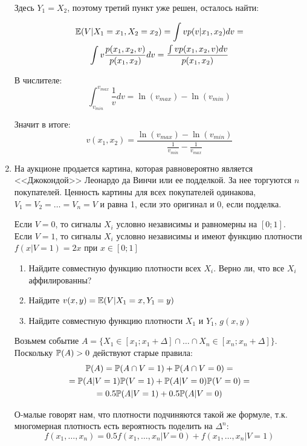 \begin{enumerate}
Здесь $ Y_{1}=X_{2} $, поэтому третий пункт уже решен, осталось найти:

\begin{multline}
\E(V|X_{1}=x_{1}, X_{2}=x_{2})=\int v p(v|x_{1},x_{2})dv=\\
\int v \frac{p(x_{1},x_{2},v)}{p(x_{1},x_{2})} dv=\frac{\int v p(x_{1},x_{2},v) dv }{p(x_{1},x_{2})}
\end{multline}

В числителе:
\begin{equation}
\int_{v_{min}}^{v_{max}}\frac{1}{v}dv=\ln(v_{max})-\ln(v_{min})
\end{equation}

Значит в итоге: 
\begin{equation}
v(x_{1},x_{2})=\frac{\ln(v_{max})-\ln(v_{min})}{\frac{1}{v_{min}}-\frac{1}{v_{max}}}
\end{equation}

\item На аукционе продается картина, которая равновероятно является <<Джокондой>> Леонардо да Винчи или ее подделкой. За нее торгуются $ n $ покупателей. Ценность картины для всех покупателей одинакова, $ V_{1}=V_{2}=\ldots=V_{n}=V $ и равна 1, если это оригинал и 0, если подделка.

Если $ V=0 $, то сигналы $ X_{i} $ условно независимы и равномерны на $ [0;1] $. Если $ V=1 $, то сигналы $ X_{i} $ условно независимы и имеют функцию плотности $ f(x|V=1)=2x $ при  $x\in [0;1] $
\begin{enumerate}
\item Найдите совместную функцию плотности всех $ X_{i} $. Верно ли, что все $ X_{i} $ аффилированны?
\item Найдите $ v(x,y)=\E(V|X_{1}=x,Y_{1}=y) $
\item Найдите совместную функцию плотности $ X_{1} $ и $ Y_{1} $, $ g(x,y) $
\end{enumerate}


Возьмем событие $ A=\{X_{1}\in[x_{1};x_{1}+\Delta] \cap \ldots \cap X_{n}\in[x_{n};x_{n}+\Delta]\} $. Поскольку $ \P(A)>0 $ действуют старые правила:
\begin{multline}
\P(A)=\P(A\cap V=1)+\P(A\cap V=0)=\\
=\P(A|V=1)\P(V=1)+\P(A|V=0)\P(V=0)=\\
=0.5\P(A|V=1)+0.5\P(A|V=0)
\end{multline}

О-малые говорят нам, что плотности подчиняются такой же формуле, т.к. многомерная плотность есть вероятность поделить на $ \Delta^{n} $:
\begin{equation}
f(x_{1},\ldots,x_{n})=0.5f(x_{1},\ldots,x_{n}|V=0)+f(x_{1},\ldots,x_{n}|V=1)
\end{equation}


\end{enumerate}
